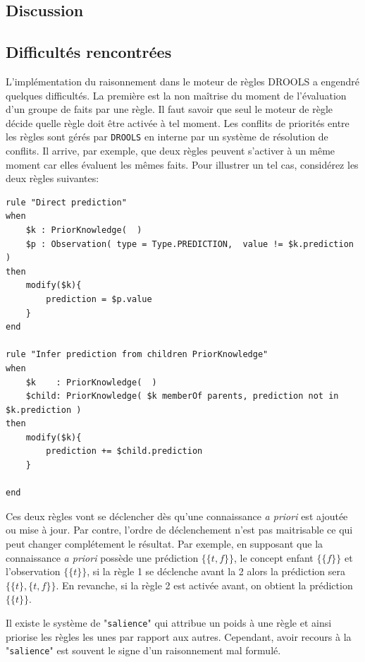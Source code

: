 \begin{refsegment}
\section{Discussion}
\subsection{Difficultés rencontrées}
L'implémentation du raisonnement dans le moteur de règles DROOLS a engendré quelques difficultés. La première est la non maîtrise du moment de l'évaluation d'un groupe de faits par une règle. Il faut savoir que seul le moteur de règle décide quelle règle doit être activée à tel moment. Les conflits de priorités entre les règles sont gérés par \texttt{DROOLS} en interne par un système de résolution de conflits. Il arrive, par exemple, que deux règles peuvent s'activer à un même moment car elles évaluent les mêmes faits. Pour illustrer un tel cas, considérez les deux règles suivantes:

\begin{lstlisting}[style=drl-style,caption=conflit]
rule "Direct prediction"
when
	$k : PriorKnowledge(  )
	$p : Observation( type = Type.PREDICTION,  value != $k.prediction )
then
	modify($k){
		prediction = $p.value
	}
end

rule "Infer prediction from children PriorKnowledge"
when
	$k    : PriorKnowledge(  )
	$child: PriorKnowledge( $k memberOf parents, prediction not in $k.prediction )
then
	modify($k){
		prediction += $child.prediction
	}

end
\end{lstlisting}

Ces deux règles vont se déclencher dès qu'une connaissance \textit{a priori} est ajoutée ou mise à jour. Par contre, l'ordre de déclenchement n'est pas maitrisable ce qui peut changer complétement le résultat. Par exemple, en supposant que la connaissance \textit{a priori}  possède une prédiction $\{\{t,f\}\}$, le concept enfant  $\{\{f\}\}$ et l'observation $\{\{t\}\}$, si la règle 1 se déclenche avant la 2 alors la prédiction sera $\{\{t\},\{t,f\}\}$. En revanche, si la règle 2 est activée avant, on obtient la prédiction  $\{\{t\}\}$.

Il existe le système de "\texttt{salience}" qui attribue un poids à une règle et ainsi priorise les règles les unes par rapport aux autres.  Cependant, avoir recours à la "\texttt{salience}" est souvent le signe d'un raisonnement mal formulé.


\end{refsegment}
